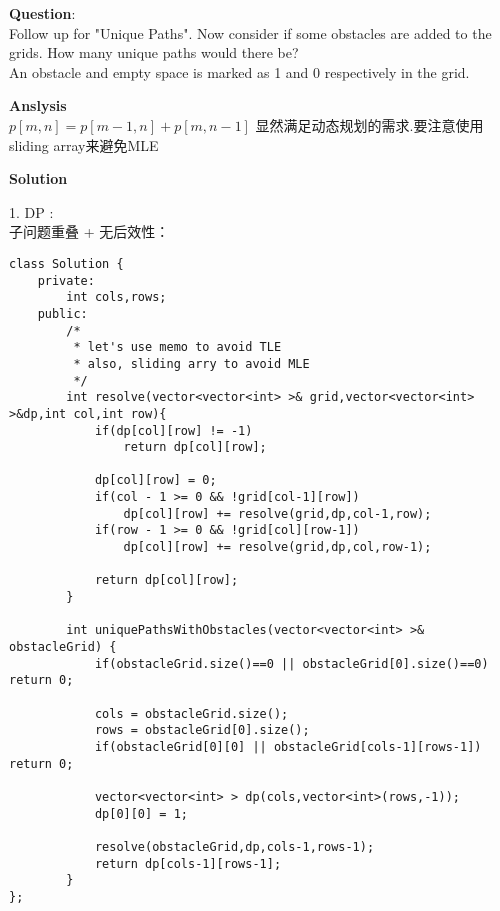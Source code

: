     \begin{description}
    \item{\textbf{Question}}:\\%
		Follow up for "Unique Paths". Now consider if some obstacles are added to the grids. How many unique paths would there be?\\
		An obstacle and empty space is marked as 1 and 0 respectively in the grid.\\

    \item{\textbf{Anslysis}}\\
		$p[m,n]=p[m-1,n]+p[m,n-1]$
		显然满足动态规划的需求.要注意使用sliding array来避免MLE
		

    \item{\textbf{Solution}}\\
	\item{1. DP} : \\
		子问题重叠 + 无后效性：\\

    \begin{lstlisting}
class Solution {
	private:
		int cols,rows;
	public:
		/*
		 * let's use memo to avoid TLE
		 * also, sliding arry to avoid MLE
		 */
		int resolve(vector<vector<int> >& grid,vector<vector<int> >&dp,int col,int row){
			if(dp[col][row] != -1)
				return dp[col][row];

			dp[col][row] = 0;
			if(col - 1 >= 0 && !grid[col-1][row])
				dp[col][row] += resolve(grid,dp,col-1,row);
			if(row - 1 >= 0 && !grid[col][row-1])
				dp[col][row] += resolve(grid,dp,col,row-1);

			return dp[col][row];
		}

		int uniquePathsWithObstacles(vector<vector<int> >& obstacleGrid) {
			if(obstacleGrid.size()==0 || obstacleGrid[0].size()==0)	return 0;

			cols = obstacleGrid.size();
			rows = obstacleGrid[0].size();
			if(obstacleGrid[0][0] || obstacleGrid[cols-1][rows-1])	return 0;

			vector<vector<int> > dp(cols,vector<int>(rows,-1));
			dp[0][0] = 1;

			resolve(obstacleGrid,dp,cols-1,rows-1);
			return dp[cols-1][rows-1];
		}
};
    \end{lstlisting}
\end{description}

